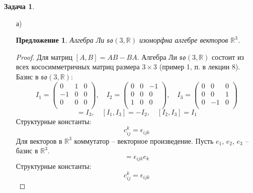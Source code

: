 \documentclass[12pt]{article}
\newtheorem{predl}[theorem]{Предложение}
\theoremstyle{definition}
\newtheorem{zad}{Задача}[section]
\begin{document}
\begin{zad}
\begin{itemize}
    \item[а)]
    \begin{predl}
        Алгебра Ли $\mathfrak{so}(3,\mathbb{R})$ изоморфна алгебре векторов $\mathbb{R}^3$.
    \end{predl}
    \begin{proof}
        Для матриц $[A,B]=AB-BA$. Алгебра Ли $\mathfrak{so}(3,\mathbb{R})$ состоит из всех кососимметричных матриц размера $3\times3$ (пример 1, п. в лекции 8). Базис в $\mathfrak{so}(3,\mathbb{R})$:
        \begin{equation}
            I_1=\left(
        \begin{array}{ccc}
        0 & 1 & 0\\
        -1 & 0 & 0\\
        0 & 0 & 0\\
        \end{array}
        \right),\quad I_2=\left(
        \begin{array}{ccc}
        0 & 0 & -1\\
        0 & 0 & 0\\
        1 & 0 & 0\\
        \end{array}
        \right),\quad I_3=\left(
        \begin{array}{ccc}
        0 & 0 & 0\\
        0 & 0 & 1\\
        0 & -1 & 0\\
        \end{array}
        \right)
        \end{equation}
        \begin{equation}
            [I_1,I_2]=I_3,\quad [I_1,I_3]=-I_2,\quad [I_2,I_3]=I_1
        \end{equation}
        Структурные константы:
        \begin{equation}
            c_{ij}^k=\epsilon_{ijk}
        \end{equation}
        Для векторов в $\mathbb{R}^3$ коммутатор -- векторное произведение. Пусть $e_1$, $e_2$, $e_3$ -- базис в $\mathbb{R}^3$.
        \begin{equation}
            [e_i,e_j]=\epsilon_{ijk}e_k
        \end{equation}
        Структурные константы:
        \begin{equation}
            c_{ij}^k=\epsilon_{ijk}

\end{equation}
\end{proof}
\end{itemize}
\end{zad}
\end{document}
